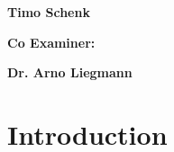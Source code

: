 \documentclass[11pt, a4paper]{report}
\begin{document}
\begin{titelpage}
{\begin{minipage}[t]{0.47\textwidth}
                \end{minipage}
                \hfill
                \begin{minipage}[t]{0.47\textwidth}\raggedleft
                \large \textbf {Timo Schenk}\\
                \end{minipage}
                \begin{minipage}[t]{0.47\textwidth}
                \large \textbf {Co Examiner:}\\
                \end{minipage}
                \hfill
                \begin{minipage}[t]{0.47\textwidth}\raggedleft
                \large \textbf {Dr. Arno Liegmann}\\
                \end{minipage}
                \vfill
            }
        \clearpage
    \end{titelpage}
    \setcounter{page}{2}
    \tableofcontents
    \chapter{Introduction}
\end{document}
